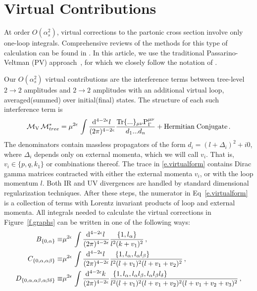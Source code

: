 \documentclass[prd,preprintnumbers,nofootinbib,superscriptaddress,onecolumn,preprint]{revtex4-1}
\newcommand\3[1]{\boldsymbol{#1}}
\newcommand{\contractortot}[1]{\ensuremath{{\rm P}}_{#1}}
\begin{document}
\section{Virtual Contributions}
\label{a.virt}

At order $O(\alpha_s^2)$, virtual corrections to the partonic cross
section involve only one-loop integrals.  Comprehensive reviews of the
methods for this type of calculation can be found in
\cite{Berger:2009zb,Britto:2010xq,Ellis:2011cr}.  In this article, we
use the traditional Passarino-Veltman (PV)
approach~\cite{Passarino:1978jh}, for which we closely follow the
notation of \cite{Ellis:2011cr}. 

Our $O(\alpha_s^2)$ virtual contributions are the interference terms
between tree-level $2 \to 2$ amplitudes and $2 \to 2$ amplitudes with
an additional virtual loop, averaged(summed) over initial(final)
states.  The structure of each such interference term is
%
\begin{align}
\label{e.virtualform}
{\cal M}_{\rm V}\,{\cal M}^*_{tree} 
  =\mu^{2 \epsilon}\,\intloopb 
   \frac{{\rm Tr}\{...\}_{\mu\nu} \contractortot{\Gamma}^{\mu \nu}}
        {d_1 ... d_n} + {\rm Hermitian \; Conjugate} \, .
\end{align}
%
The denominators contain massless propagators of the form
$d_i=(l+\Delta_i)^2+i0$, where $\Delta_i$ depends only on external
momenta, which we will call $v_i$. That is, $v_i \in \{p,q,k_1\}$ or
combinations thereof.  The trace in \eqref{e.virtualform} contains
Dirac gamma matrices contracted with either the external momenta
$v_i$, or with the loop momentum $l$. Both IR and UV divergences are
handled by standard dimensional regularization techniques.  After
these steps, the numerator in Eq~\eqref{e.virtualform} is a collection
of terms with Lorentz invariant products of loop and external momenta.
All integrals needed to calculate the virtual corrections in
Figure~\ref{f.graphs} can be written in one of the following ways:
%
\begin{align}
B_{\{0,\alpha\}}
  \equiv& \mu^{2 \epsilon}\,\intloopb
          \frac{\{1,l_\alpha\}}
          {l^2(k+v_1)^2}\,,\nonumber\\
C_{\{0,\alpha,\alpha\beta\}}
  \equiv&\mu^{2 \epsilon}\,\intloopb
         \frac{\{1,l_\alpha,l_\alpha l_\beta\}\hspace{40pt}}
              {l^2(l+v_1)^2(l+v_1+v_2)^2}\,,\nonumber\\
D_{\{0,\alpha,\alpha\beta,\alpha\beta\delta\}}
  \equiv&\mu^{2 \epsilon}\,\intloop
  \frac{\{1,l_\alpha,l_\alpha l_\beta,l_\alpha l_\beta l_\delta\}\hspace{98pt}}
       {l^2(l+v_1)^2(l+v_1+v_2)^2(l+v_1+v_2+v_3)^2}\,,
\label{e.virtualtypical}
\end{align} 
\end{document}
